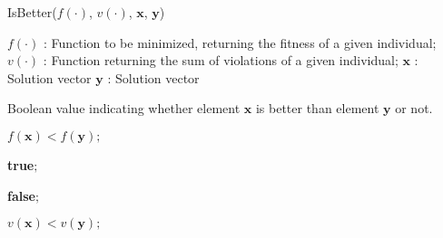 \begin{breakablealgorithm}
\caption{IsBetter($f(\cdot)$, $v(\cdot)$, $\bm{x}$, $\bm{y}$)}
\label{alg:IsBetter}
\begin{algorithmic}[1]


\INPUT{}
\Statex $f(\cdot)$ : Function to be minimized, returning the fitness of a given individual;
\Statex $v(\cdot)$ : Function returning the sum of violations of a given individual;
\Statex $\bm{x}$ : Solution vector
\Statex $\bm{y}$ : Solution vector
\Statex

\OUTPUT{}
\Statex Boolean value indicating whether element $\bm{x}$ is better than element $\bm{y}$ or not.
\Statex
\Statex

\State \Return $f(\bm{x}) < f(\bm{y});$
\Statex

\State \Return \textbf{true}$;$
\Statex

\State \Return \textbf{false}$;$
\Statex
\EndIf

\Statex
\State \Return $v(\bm{x}) < v(\bm{y});$




\end{algorithmic}
\end{breakablealgorithm}
